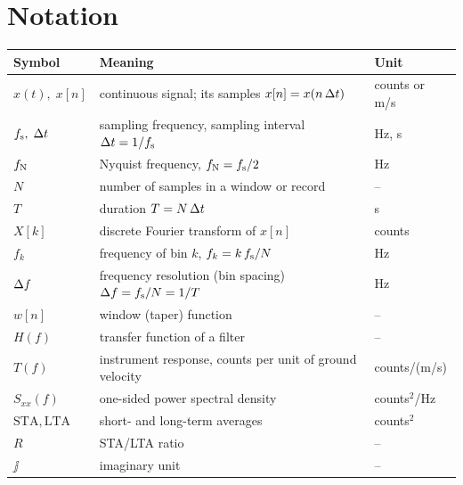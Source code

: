 \chapter*{Notation}
\begin{center}
\small
\begin{tabularx}{\linewidth}{@{}l X l@{}}
\toprule
Symbol & Meaning & Unit\\ \midrule
$x(t),\;x[n]$ & continuous signal; its samples $x[n]=x(n\,\Delta t)$ & counts or m/s\\
$f_{\mathrm{s}},\;\Delta t$ & sampling frequency, sampling interval $\Delta t = 1/f_{\mathrm{s}}$ & Hz, s\\
$f_{\mathrm{N}}$ & Nyquist frequency, $f_{\mathrm{N}}=f_{\mathrm{s}}/2$ & Hz\\
$N$ & number of samples in a window or record & --\\
$T$ & duration $T=N\,\Delta t$ & s\\
$X[k]$ & discrete Fourier transform of $x[n]$ & counts\\
$f_k$ & frequency of bin $k$, $f_k = k\,f_{\mathrm{s}}/N$ & Hz\\
$\Delta f$ & frequency resolution (bin spacing) $\Delta f=f_{\mathrm{s}}/N=1/T$ & Hz\\
$w[n]$ & window (taper) function & --\\
$H(f)$ & transfer function of a filter & --\\
$T(f)$ & instrument response, counts per unit of ground velocity & counts/(m/s)\\
$S_{xx}(f)$ & one-sided power spectral density & counts$^2$/Hz\\
$\mathrm{STA},\mathrm{LTA}$ & short- and long-term averages & counts$^2$\\
$R$ & STA/LTA ratio & --\\
$\jj$ & imaginary unit & --\\
\bottomrule
\end{tabularx}
\end{center}
